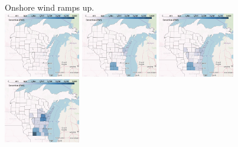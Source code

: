 \documentclass[xcolor=dvipsnames]{beamer}
\begin{document}
\begin{frame}
  Onshore wind ramps up.\\
  \includegraphics[width=0.25\textwidth]{includes/no_leakage_shutdowns_wind_r0.png}
  \includegraphics[width=0.25\textwidth]{includes/no_leakage_shutdowns_wind_r2.png}
  \includegraphics[width=0.25\textwidth]{includes/no_leakage_shutdowns_wind_r3.png}
  \includegraphics[width=0.25\textwidth]{includes/no_leakage_shutdowns_wind_r4.png}
\end{frame}
\end{document}
